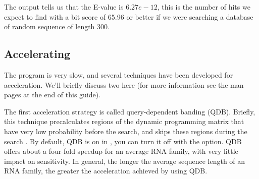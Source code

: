 The output tells us that the E-value is $6.27e-12$, this is the number
of hits we expect to find with a bit score of 65.96 or better if we
were searching a database of random sequence of length 300.

\subsection{Accelerating }
The  program is very slow, and several techniques have
been developed for acceleration. We'll briefly discuss two here (for
more information see the  man pages at the end of this
guide).

The first acceleration strategy is called query-dependent banding
(QDB). Briefly, this technique precalculates regions of the dynamic programming
matrix that have very low probability before the search, and skips these
regions during the search \cite{NawrockiEddy07}. 
By default, QDB is on in , you can turn it off with the
 option. QDB offers about a four-fold speedup for an
average RNA family, with very little impact on sensitivity. In
general, the longer the average sequence length of an RNA family, the
greater the acceleration achieved by using QDB.

